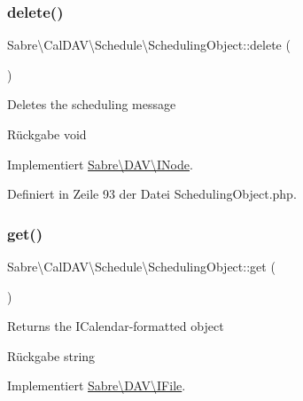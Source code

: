 \subsubsection{\texorpdfstring{delete()}{delete()}}
{\footnotesize\ttfamily Sabre\textbackslash{}\+Cal\+D\+A\+V\textbackslash{}\+Schedule\textbackslash{}\+Scheduling\+Object\+::delete (\begin{DoxyParamCaption}{ }\end{DoxyParamCaption})}

Deletes the scheduling message

\begin{DoxyReturn}{Rückgabe}
void 
\end{DoxyReturn}


Implementiert \mbox{\hyperlink{interface_sabre_1_1_d_a_v_1_1_i_node_a72cd0ee4e36dfced2b0412d14dbd73e6}{Sabre\textbackslash{}\+D\+A\+V\textbackslash{}\+I\+Node}}.



Definiert in Zeile 93 der Datei Scheduling\+Object.\+php.

\mbox{\label{class_sabre_1_1_cal_d_a_v_1_1_schedule_1_1_scheduling_object_a98094b6dd7d1113b10f2b492e956d6e7}} 
\subsubsection{\texorpdfstring{get()}{get()}}
{\footnotesize\ttfamily Sabre\textbackslash{}\+Cal\+D\+A\+V\textbackslash{}\+Schedule\textbackslash{}\+Scheduling\+Object\+::get (\begin{DoxyParamCaption}{ }\end{DoxyParamCaption})}

Returns the I\+Calendar-\/formatted object

\begin{DoxyReturn}{Rückgabe}
string 
\end{DoxyReturn}


Implementiert \mbox{\hyperlink{interface_sabre_1_1_d_a_v_1_1_i_file_a3102812af0567c3cfd9cd6c20104bd27}{Sabre\textbackslash{}\+D\+A\+V\textbackslash{}\+I\+File}}.



